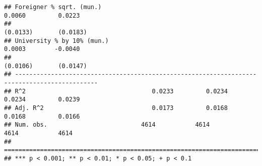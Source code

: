 \documentclass[
]{article}
\begin{document}
\begin{verbatim}
## Foreigner % sqrt. (mun.)                                            0.0060         0.0223    
##                                                                    (0.0133)       (0.0183)   
## University % by 10% (mun.)                                          0.0003        -0.0040    
##                                                                    (0.0106)       (0.0147)   
## ---------------------------------------------------------------------------------------------
## R^2                                   0.0233         0.0234         0.0234         0.0239    
## Adj. R^2                              0.0173         0.0168         0.0168         0.0166    
## Num. obs.                          4614           4614           4614           4614         
## =============================================================================================
## *** p < 0.001; ** p < 0.01; * p < 0.05; + p < 0.1
\end{verbatim}
\end{document}
